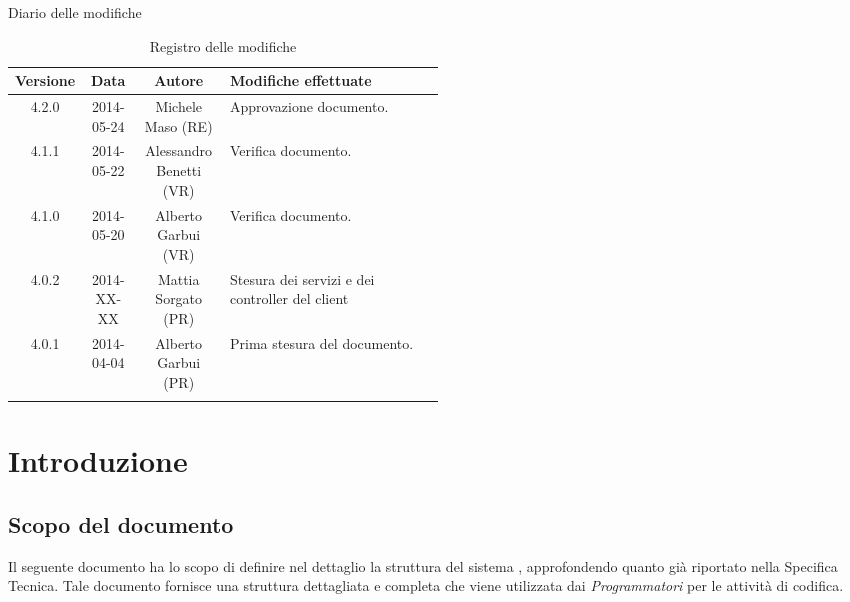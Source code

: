 
\newpage
Diario delle modifiche
\begin{center}
\begin{longtable}{|c|c|c|p{0.5\linewidth}|}
\toprule
\textbf{Versione} & \textbf{Data} & \textbf{Autore} & \textbf{Modifiche effettuate}\\

\midrule
4.2.0 & 2014-05-24 & Michele Maso (RE) & Approvazione documento.\\
\midrule
4.1.1 & 2014-05-22 & Alessandro Benetti (VR) & Verifica documento.\\
\midrule
4.1.0 & 2014-05-20 & Alberto Garbui (VR) & Verifica documento.\\

\midrule
4.0.2 & 2014-XX-XX & Mattia Sorgato (PR) & Stesura dei servizi e dei controller del client\\
\midrule
4.0.1 & 2014-04-04 & Alberto Garbui (PR) & Prima stesura del documento.\\

\bottomrule
\caption{Registro delle modifiche}
\label{tab:changelog}

\end{longtable}
\end{center}

\newpage
\tableofcontents

\newpage
\listoffigures %

\newpage
\section{Introduzione}
\subsection{Scopo del documento}
Il seguente documento ha lo scopo di definire nel dettaglio la struttura del sistema , approfondendo quanto già riportato nella Specifica Tecnica. Tale documento fornisce una struttura dettagliata e completa che viene utilizzata dai \emph{Programmatori} per le attività di codifica.

